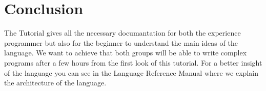 \section{Conclusion}
\label{sect:conclusion}
The \lang{} Tutorial gives all the necessary documantation for both the experience programmer but also for the beginner to understand the main ideas of the language. We want to achieve that both groups will be able to write complex \lang{} programs after a few hours from the first  look of this tutorial. For a better insight of the \lang{} language you can see in the Language Reference Manual where we explain the architecture of the language.
